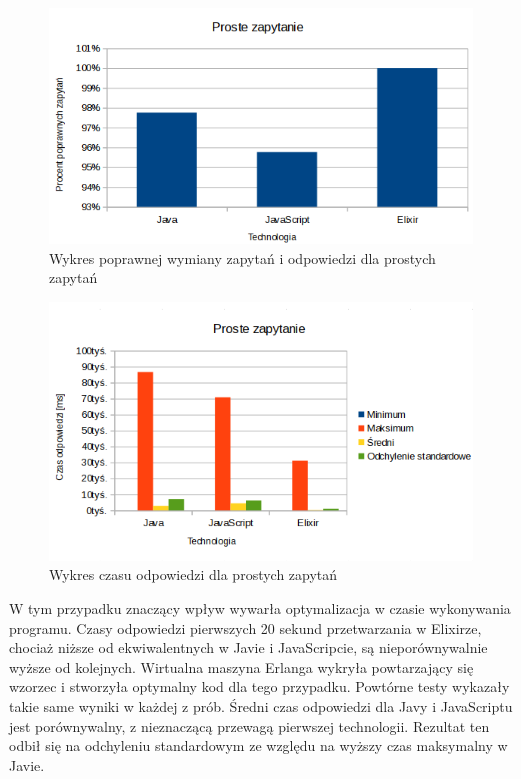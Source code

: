 \documentclass[12pt,twoside]{article}
\begin{document}
\begin{figure}[!ht]
\centering
\includegraphics[resolution=120]{test_results/summary/simple_percentage.png}
\caption{Wykres poprawnej wymiany zapytań i odpowiedzi dla prostych zapytań}
\end{figure}

\begin{figure}[!ht]
\centering
\includegraphics[resolution=120]{test_results/summary/simple_response.png}
\caption{Wykres czasu odpowiedzi dla prostych zapytań}
\end{figure}

W tym przypadku znaczący wpływ wywarła optymalizacja w czasie
wykonywania programu. Czasy odpowiedzi pierwszych 20 sekund
przetwarzania w Elixirze, chociaż niższe od ekwiwalentnych w Javie i
JavaScripcie, są nieporównywalnie wyższe od kolejnych. Wirtualna maszyna
Erlanga wykryła powtarzający się wzorzec i stworzyła optymalny kod dla
tego przypadku. Powtórne testy wykazały takie same wyniki w każdej z
prób. Średni czas odpowiedzi dla Javy i JavaScriptu jest porównywalny, z
nieznaczącą przewagą pierwszej technologii. Rezultat ten odbił się na
odchyleniu standardowym ze względu na wyższy czas maksymalny w Javie.
\end{document}
